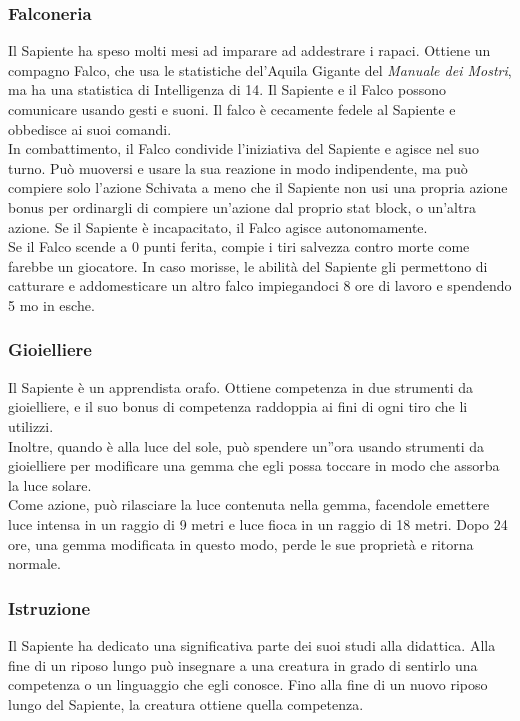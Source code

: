 \subsubsection{Falconeria}
Il Sapiente ha speso molti mesi ad imparare ad addestrare i rapaci. Ottiene un compagno Falco, che usa le statistiche del'Aquila Gigante del \textit{Manuale dei Mostri}, ma ha una statistica di Intelligenza di 14. Il Sapiente e il Falco possono comunicare usando gesti e suoni. Il falco è cecamente fedele al Sapiente e obbedisce ai suoi comandi.\\
In combattimento, il Falco condivide l'iniziativa del Sapiente e agisce nel suo turno. Può muoversi e usare la sua reazione in modo indipendente, ma può compiere solo l'azione Schivata a meno che il Sapiente non usi una propria azione bonus per ordinargli di compiere un'azione dal proprio stat block, o un'altra azione. Se il Sapiente è incapacitato, il Falco agisce autonomamente.\\
Se il Falco scende a 0 punti ferita, compie i tiri salvezza contro morte come farebbe un giocatore. In caso morisse, le abilità del Sapiente gli permettono di catturare e addomesticare un altro falco impiegandoci 8 ore di lavoro e spendendo 5 mo in esche.

\subsubsection{Gioielliere}
Il Sapiente è un apprendista orafo. Ottiene competenza in due strumenti da gioielliere, e il suo bonus di competenza raddoppia ai fini di ogni tiro che li utilizzi.\\
Inoltre, quando è alla luce del sole, può spendere un''ora usando strumenti da gioielliere per modificare  una gemma che egli possa toccare in modo che assorba la luce solare.\\ 
Come azione, può rilasciare la luce contenuta nella gemma, facendole emettere luce intensa in un raggio di 9 metri e luce fioca in un raggio di 18 metri. Dopo 24 ore, una gemma modificata in questo modo, perde le sue proprietà e ritorna normale.

\subsubsection{Istruzione}
Il Sapiente ha dedicato una significativa parte dei suoi studi alla didattica. Alla fine di un riposo lungo può insegnare a una creatura in grado di sentirlo una competenza o un linguaggio che egli conosce. Fino alla fine di un nuovo riposo lungo del Sapiente, la creatura ottiene quella competenza.

